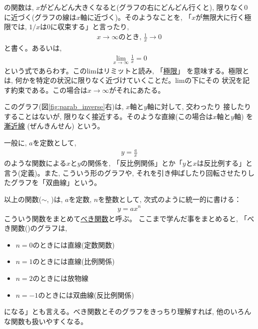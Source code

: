 
の関数は, $x$がどんどん大きくなると(グラフの右にどんどん行くと), 
限りなく0に近づく(グラフの線は$x$軸に近づく)。そのようなことを, 「$x$が無限大に行く極限では, 
$1/x$は0に収束する」と言ったり, 
\begin{eqnarray}
x\rightarrow \infty \text{のとき, }\frac{1}{x}\rightarrow0
\end{eqnarray}
と書く。あるいは, 
\begin{eqnarray}
\lim_{x\rightarrow \infty}\frac{1}{x}=0\label{eq:limit_new}
\end{eqnarray}
という式であらわす。このlimはリミットと読み, 「\underline{極限}」
を意味する。極限とは, 何かを特定の状況に限りなく近づけていくことだ。limの下にその
状況を記す約束である。この場合は$x\rightarrow \infty$がそれにあたる。

このグラフ(図\ref{fig:parab_inverse}右)は, $x$軸と$y$軸に対して, 交わったり
接したりすることはないが, 限りなく接近する。そのような直線(この場合は$x$軸と$y$軸)
を\underline{漸近線} (ぜんきんせん)
という。

一般に, $a$を定数として, 
\begin{eqnarray}y=\frac{a}{x}\label{eq:ex1ovsrx2}\end{eqnarray}
のような関数による$x$と$y$の関係を, 「反比例関係」とか「$y$と$x$は反比例する」と言う(定義)。また, こういう形のグラフや, 
それを引き伸ばしたり回転させたりしたグラフを「双曲線」という。\hv

以上の関数($\sim$, )は, 
$a$を定数, $n$を整数として, 次式のように統一的に書ける：
\begin{eqnarray}
y=ax^n\label{eq:func_power_func}
\end{eqnarray}
こういう関数をまとめて\underline{べき関数}と呼ぶ。
ここまで学んだ事をまとめると, 「べき関数()のグラフは,  
\begin{itemize}
\item $n=0$のときには直線(定数関数)
\item $n=1$のときには直線(比例関係)
\item $n=2$のときには放物線
\item $n=-1$のときには双曲線(反比例関係)
\end{itemize}
になる」とも言える。べき関数とそのグラフをきっちり理解すれば, 
他のいろんな関数も扱いやすくなる。\hv


